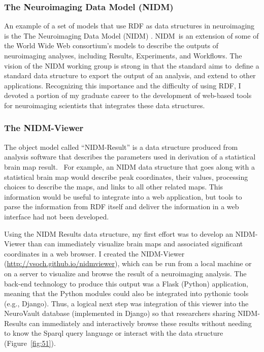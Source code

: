 \documentclass{report}
\begin{document}
\subsubsection{The Neuroimaging Data Model (NIDM)}

An example of a set of models that use RDF as data structures in
neuroimaging is the The Neuroimaging Data Model (NIDM) \cite{noauthor_undated-pr}.
NIDM~is an extension of some of the World Wide Web consortium's models
to describe the outputs of neuroimaging analyses, including Results,
Experiments, and Workflows. The vision of the NIDM working group is
strong in that the standard aims to~define a standard data structure to
export the output of an analysis, and extend to other applications.
Recognizing this importance and the difficulty of using RDF, I devoted a
portion of my graduate career to the development of web-based tools for
neuroimaging scientists that integrates these data structures.

\subsubsection{The NIDM-Viewer}

The object model called ``NIDM-Result'' is a data structure produced
from analysis software that describes the parameters used in derivation
of a statistical brain map result. ~For example, an NIDM data structure
that goes along with a statistical brain map would describe peak
coordinates, their values, processing choices to describe the maps, and
links to all other related maps. This information would be useful to
integrate into a web application, but tools to parse the information
from RDF itself and deliver the information in a web interface had not
been developed.

Using the NIDM Results data structure, my first effort was to develop an
NIDM-Viewer than can immediately visualize brain maps and associated
significant coordinates in a web browser. I created the NIDM-Viewer
(\href{http://vsoch.github.io/nidmviewer}{http://vsoch.github.io/nidmviewer}),
which can be run from a local machine or on a server to visualize and
browse the result of a neuroimaging analysis. The back-end technology to
produce this output was a Flask (Python) application, meaning that the
Python modules could also be integrated into pythonic tools (e.g.,
Django). Thus, a logical next step was integration of this viewer into
the NeuroVault database (implemented in Django) so that researchers
sharing NIDM-Results can immediately and interactively browse these
results without needing to know the Sparql query language or interact
with the data structure (Figure~\ref{fig:51}).
\end{document}
